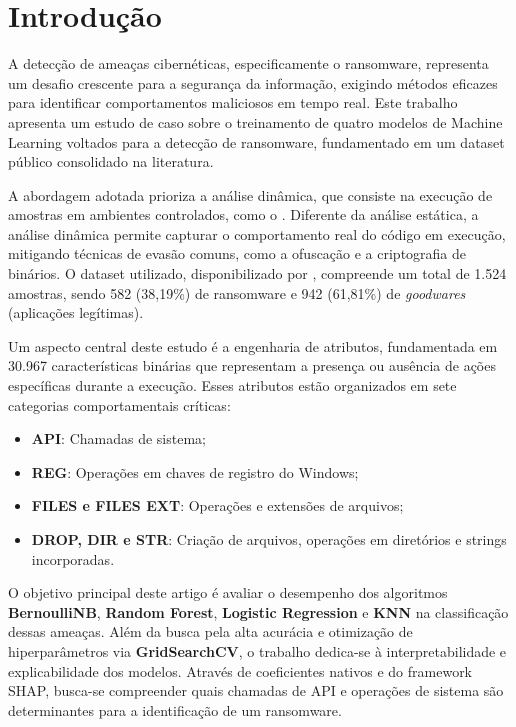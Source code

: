 
\section{Introdução} \label{sec:intro}

A detecção de ameaças cibernéticas, especificamente o ransomware, representa um desafio crescente para a segurança da informação, exigindo métodos eficazes para identificar comportamentos maliciosos em tempo real. Este trabalho apresenta um estudo de caso sobre o treinamento de quatro modelos de Machine Learning voltados para a detecção de ransomware, fundamentado em um dataset público consolidado na literatura.

A abordagem adotada prioriza a análise dinâmica, que consiste na execução de amostras em ambientes controlados, como o \cite{cuckoosandbox}. Diferente da análise estática, a análise dinâmica permite capturar o comportamento real do código em execução, mitigando técnicas de evasão comuns, como a ofuscação e a criptografia de binários. O dataset utilizado, disponibilizado por \cite{sgandurra2016}, compreende um total de 1.524 amostras, sendo 582 (38,19\%) de ransomware e 942 (61,81\%) de \textit{goodwares} (aplicações legítimas).

Um aspecto central deste estudo é a engenharia de atributos, fundamentada em 30.967 características binárias que representam a presença ou ausência de ações específicas durante a execução. Esses atributos estão organizados em sete categorias comportamentais críticas:
\begin{itemize}
	\item \textbf{API}: Chamadas de sistema;
	\item \textbf{REG}: Operações em chaves de registro do Windows;
	\item \textbf{FILES e FILES EXT}: Operações e extensões de arquivos;
	\item \textbf{DROP, DIR e STR}: Criação de arquivos, operações em diretórios e strings incorporadas.
\end{itemize}

O objetivo principal deste artigo é avaliar o desempenho dos algoritmos \textbf{BernoulliNB}, \textbf{Random Forest}, \textbf{Logistic Regression} e \textbf{KNN} na classificação dessas ameaças. Além da busca pela alta acurácia e otimização de hiperparâmetros via \textbf{GridSearchCV}, o trabalho dedica-se à interpretabilidade e explicabilidade dos modelos. Através de coeficientes nativos e do framework SHAP, busca-se compreender quais chamadas de API e operações de sistema são determinantes para a identificação de um ransomware.